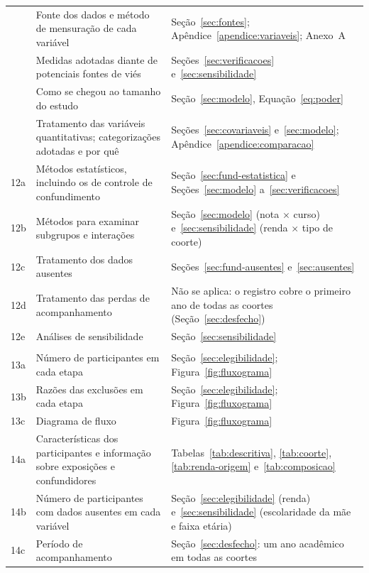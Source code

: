 \documentclass[12pt,a4paper]{article}
\begin{document}
{\begin{longtable}{>{\raggedright\arraybackslash}p{0.8cm} >{\raggedright\arraybackslash}p{7.0cm} >{\raggedright\arraybackslash}p{6.5cm}}
    8 & Fonte dos dados e método de mensuração de cada variável & Seção~\ref{sec:fontes}; Apêndice~\ref{apendice:variaveis}; Anexo~A \\
    9 & Medidas adotadas diante de potenciais fontes de viés & Seções~\ref{sec:verificacoes} e~\ref{sec:sensibilidade} \\
    10 & Como se chegou ao tamanho do estudo & Seção~\ref{sec:modelo}, Equação~\eqref{eq:poder} \\
    11 & Tratamento das variáveis quantitativas; categorizações adotadas e por quê & Seções~\ref{sec:covariaveis} e~\ref{sec:modelo}; Apêndice~\ref{apendice:comparacao} \\
    12a & Métodos estatísticos, incluindo os de controle de confundimento & Seção~\ref{sec:fund-estatistica} e Seções~\ref{sec:modelo} a~\ref{sec:verificacoes} \\
    12b & Métodos para examinar subgrupos e interações & Seção~\ref{sec:modelo} (nota $\times$ curso) e~\ref{sec:sensibilidade} (renda $\times$ tipo de coorte) \\
    12c & Tratamento dos dados ausentes & Seções~\ref{sec:fund-ausentes} e~\ref{sec:ausentes} \\
    12d & Tratamento das perdas de acompanhamento & Não se aplica: o registro cobre o primeiro ano de todas as coortes (Seção~\ref{sec:desfecho}) \\
    12e & Análises de sensibilidade & Seção~\ref{sec:sensibilidade} \\
    \multicolumn{3}{l}{\textit{Resultados}} \\
    13a & Número de participantes em cada etapa & Seção~\ref{sec:elegibilidade}; Figura~\ref{fig:fluxograma} \\
    13b & Razões das exclusões em cada etapa & Seção~\ref{sec:elegibilidade}; Figura~\ref{fig:fluxograma} \\
    13c & Diagrama de fluxo & Figura~\ref{fig:fluxograma} \\
    14a & Características dos participantes e informação sobre exposições e confundidores & Tabelas~\ref{tab:descritiva}, \ref{tab:coorte}, \ref{tab:renda-origem} e~\ref{tab:composicao} \\
    14b & Número de participantes com dados ausentes em cada variável & Seção~\ref{sec:elegibilidade} (renda) e~\ref{sec:sensibilidade} (escolaridade da mãe e faixa etária) \\
    14c & Período de acompanhamento & Seção~\ref{sec:desfecho}: um ano acadêmico em todas as coortes \\

\end{longtable}}
\end{document}
